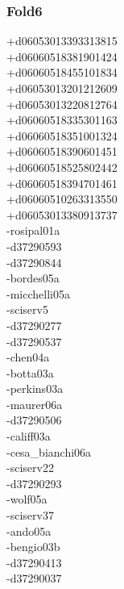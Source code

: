 \begin{multicols}{4}
\subsubsection*{Fold6}
+d06053013393313815\\
+d06060518381901424\\
+d06060518455101834\\
+d06053013201212609\\
+d06053013220812764\\
+d06060518335301163\\
+d06060518351001324\\
+d06060518390601451\\
+d06060518525802442\\
+d06060518394701461\\
+d06060510263313550\\
+d06053013380913737\\
-rosipal01a\\
-d37290593\\
-d37290844\\
-bordes05a\\
-micchelli05a\\
-sciserv5\\
-d37290277\\
-d37290537\\
-chen04a\\
-botta03a\\
-perkins03a\\
-maurer06a\\
-d37290506\\
-califf03a\\
-cesa\_bianchi06a\\
-sciserv22\\
-d37290293\\
-wolf05a\\
-sciserv37\\
-ando05a\\
-bengio03b\\
-d37290413\\
-d37290037\\

\end{multicols}
